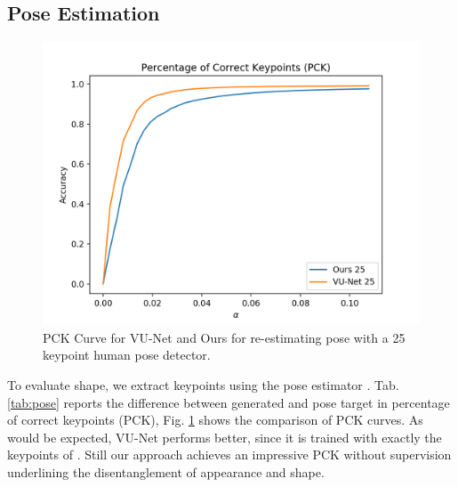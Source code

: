 	\subsection{Pose Estimation}
	\begin{figure}[htp]
		\centering
		\includegraphics[trim={0cm 0cm 0cm 0cm},clip, width=0.7\linewidth]{fig/factor/pck25}
		\caption{PCK Curve for VU-Net \cite{esser18} and Ours for re-estimating pose with a 25 keypoint human pose detector.}
		\label{fig:pckcurve}
	\end{figure}

	To evaluate shape, we extract keypoints using the pose estimator \cite{cao17affinityfield}. Tab. \ref{tab:pose} reports the difference between generated and pose target in percentage of correct keypoints (PCK), Fig. \ref{fig:pckcurve} shows the comparison of PCK curves. As would be expected, VU-Net performs better, since it is trained with exactly the keypoints of \cite{cao17affinityfield}. Still our approach achieves an impressive PCK without supervision underlining the disentanglement of appearance and shape.


